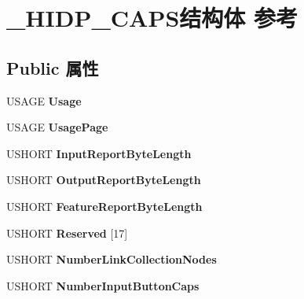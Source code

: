 \hypertarget{struct___h_i_d_p___c_a_p_s}{}\section{\+\_\+\+H\+I\+D\+P\+\_\+\+C\+A\+P\+S结构体 参考}
\label{struct___h_i_d_p___c_a_p_s}
\subsection*{Public 属性}
\begin{DoxyCompactItemize}
\item 
\mbox{\label{struct___h_i_d_p___c_a_p_s_aeccff5b85643dad69d68a3ccf4bc93df}} 
U\+S\+A\+GE {\bfseries Usage}
\item 
\mbox{\label{struct___h_i_d_p___c_a_p_s_a13be90a831dd60ff47350c866aac5c2e}} 
U\+S\+A\+GE {\bfseries Usage\+Page}
\item 
\mbox{\label{struct___h_i_d_p___c_a_p_s_aa8e7c2adb98aa94449d915c1c1f105fe}} 
U\+S\+H\+O\+RT {\bfseries Input\+Report\+Byte\+Length}
\item 
\mbox{\label{struct___h_i_d_p___c_a_p_s_a8241572bc5fd18981039c1d24482fcea}} 
U\+S\+H\+O\+RT {\bfseries Output\+Report\+Byte\+Length}
\item 
\mbox{\label{struct___h_i_d_p___c_a_p_s_a4603de8d80f5c41cc26b1d5c2cb8130b}} 
U\+S\+H\+O\+RT {\bfseries Feature\+Report\+Byte\+Length}
\item 
\mbox{\label{struct___h_i_d_p___c_a_p_s_a51b11750f5333dee8f5e1516f50600e0}} 
U\+S\+H\+O\+RT {\bfseries Reserved} \mbox{[}17\mbox{]}
\item 
\mbox{\label{struct___h_i_d_p___c_a_p_s_a00e538ac017dadcc38ea3cf38cdad24f}} 
U\+S\+H\+O\+RT {\bfseries Number\+Link\+Collection\+Nodes}
\item 
\mbox{\label{struct___h_i_d_p___c_a_p_s_a010f5637810b16a9a71f7de9129d2b5d}} 
U\+S\+H\+O\+RT {\bfseries Number\+Input\+Button\+Caps}

\end{DoxyCompactItemize}
